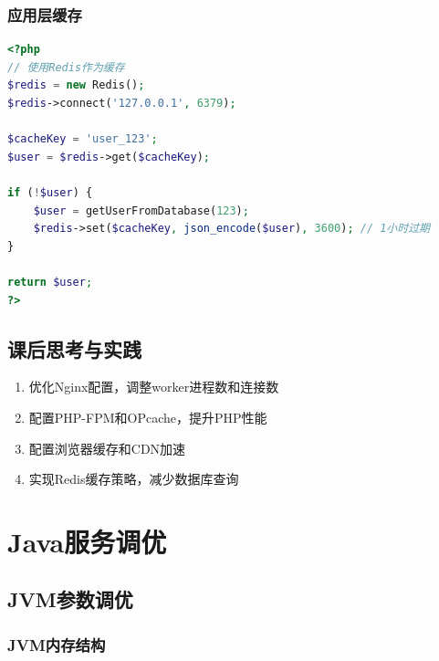\documentclass[12pt,UTF8]{ctexbook}
\begin{document}
\subsection*{应用层缓存}

\begin{lstlisting}[language=php]
<?php
// 使用Redis作为缓存
$redis = new Redis();
$redis->connect('127.0.0.1', 6379);

$cacheKey = 'user_123';
$user = $redis->get($cacheKey);

if (!$user) {
    $user = getUserFromDatabase(123);
    $redis->set($cacheKey, json_encode($user), 3600); // 1小时过期
}

return $user;
?>
\end{lstlisting}

\section{课后思考与实践}
\label{sec:web-tuning-practice}
\begin{enumerate}
    \item 优化Nginx配置，调整worker进程数和连接数
    \item 配置PHP-FPM和OPcache，提升PHP性能
    \item 配置浏览器缓存和CDN加速
    \item 实现Redis缓存策略，减少数据库查询
\end{enumerate}

\chapter{Java服务调优}
\label{chap:java-tuning}

\section{JVM参数调优}
\label{sec:jvm-tuning}

\subsection*{JVM内存结构}
\end{document}

